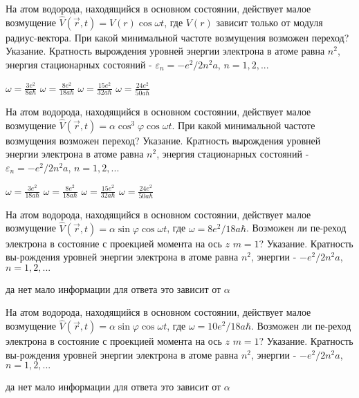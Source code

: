 \documentclass[11pt,a4paper]{exam}
\begin{document}
\begin{questions}
\question На атом водорода, находящийся в основном состоянии, действует малое возмущение $\hat V(\vec r,t) = V(r)\cos \omega t$, где $V(r)$ зависит только от модуля радиус-вектора. При какой минимальной частоте возмущения возможен переход? Указание. Кратность вырождения уровней энергии электрона в атоме равна ${n^2}$, энергия стационарных состояний - ${\varepsilon _n} =  - {e^2}/2{n^2}a$, $n = 1,2,...$
\begin{choices}
\choice $\omega  = \frac{{3{e^2}}}{{8a\hbar }}$      
\choice $\omega  = \frac{{8{e^2}}}{{18a\hbar }}$     
\choice $\omega  = \frac{{15{e^2}}}{{32a\hbar }}$    
\choice $\omega  = \frac{{24{e^2}}}{{50a\hbar }}$
\end{choices}

\question На атом водорода, находящийся в основном состоянии, действует малое возмущение $\hat V(\vec r,t) = \alpha {\cos ^3}\varphi \cos \omega t$. При какой минимальной частоте возмущения возможен переход? Указание. Кратность вырождения уровней энергии электрона в атоме равна ${n^2}$, энергия стационарных состояний - ${\varepsilon _n} =  - {e^2}/2{n^2}a$, $n = 1,2,...$
\begin{choices}
\choice $\omega  = \frac{{3{e^2}}}{{18a\hbar }}$     
\choice $\omega  = \frac{{8{e^2}}}{{18a\hbar }}$     
\choice $\omega  = \frac{{15{e^2}}}{{32a\hbar }}$    
\choice $\omega  = \frac{{24{e^2}}}{{50a\hbar }}$
\end{choices}

\question На атом водорода, находящийся в основном состоянии, действует малое возмущение $\hat V(\vec r,t) = \alpha \sin \varphi \cos \omega t$, где $\omega  = 8{e^2}/18a\hbar $. Возможен ли пе-реход электрона в состояние с проекцией момента на ось $z$ $m = 1$? Указание. Кратность вы-рождения уровней энергии электрона в атоме равна ${n^2}$, энергии - $ - {e^2}/2{n^2}a$, $n = 1,2,...$
\begin{choices}
\choice да    
\choice нет      
\choice мало информации для ответа    
\choice это зависит от $\alpha $
\end{choices}

\question На атом водорода, находящийся в основном состоянии, действует малое возмущение $\hat V(\vec r,t) = \alpha \sin \varphi \cos \omega t$, где $\omega  = 10{e^2}/18a\hbar $. Возможен ли пе-реход электрона в состояние с проекцией момента на ось $z$ $m = 1$? Указание. Кратность вы-рождения уровней энергии электрона в атоме равна ${n^2}$, энергии - $ - {e^2}/2{n^2}a$, $n = 1,2,...$
\begin{choices}
\choice да    
\choice нет      
\choice мало информации для ответа    
\choice это зависит от $\alpha $
\end{choices}


\end{questions}
\end{document}
